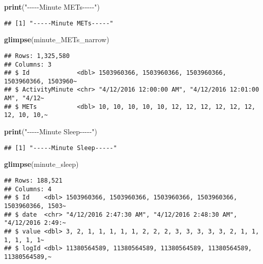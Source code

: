 \documentclass[
]{article}
\newenvironment{Shaded}{\begin{snugshade}}{\end{snugshade}}
\newcommand{\FunctionTok}[1]{\textcolor[rgb]{0.13,0.29,0.53}{\textbf{#1}}}
\newcommand{\NormalTok}[1]{#1}
\newcommand{\StringTok}[1]{\textcolor[rgb]{0.31,0.60,0.02}{#1}}
\begin{document}
\begin{Shaded}
\begin{Highlighting}[]
\FunctionTok{print}\NormalTok{(}\StringTok{"{-}{-}{-}{-}{-}Minute METs{-}{-}{-}{-}{-}"}\NormalTok{)}
\end{Highlighting}
\end{Shaded}

\begin{verbatim}
## [1] "-----Minute METs-----"
\end{verbatim}

\begin{Shaded}
\begin{Highlighting}[]
\FunctionTok{glimpse}\NormalTok{(minute\_METs\_narrow)}
\end{Highlighting}
\end{Shaded}

\begin{verbatim}
## Rows: 1,325,580
## Columns: 3
## $ Id             <dbl> 1503960366, 1503960366, 1503960366, 1503960366, 1503960~
## $ ActivityMinute <chr> "4/12/2016 12:00:00 AM", "4/12/2016 12:01:00 AM", "4/12~
## $ METs           <dbl> 10, 10, 10, 10, 10, 12, 12, 12, 12, 12, 12, 12, 10, 10,~
\end{verbatim}

\begin{Shaded}
\begin{Highlighting}[]
\FunctionTok{print}\NormalTok{(}\StringTok{"{-}{-}{-}{-}{-}Minute Sleep{-}{-}{-}{-}{-}"}\NormalTok{)}
\end{Highlighting}
\end{Shaded}

\begin{verbatim}
## [1] "-----Minute Sleep-----"
\end{verbatim}

\begin{Shaded}
\begin{Highlighting}[]
\FunctionTok{glimpse}\NormalTok{(minute\_sleep)}
\end{Highlighting}
\end{Shaded}

\begin{verbatim}
## Rows: 188,521
## Columns: 4
## $ Id    <dbl> 1503960366, 1503960366, 1503960366, 1503960366, 1503960366, 1503~
## $ date  <chr> "4/12/2016 2:47:30 AM", "4/12/2016 2:48:30 AM", "4/12/2016 2:49:~
## $ value <dbl> 3, 2, 1, 1, 1, 1, 1, 2, 2, 2, 3, 3, 3, 3, 3, 2, 1, 1, 1, 1, 1, 1~
## $ logId <dbl> 11380564589, 11380564589, 11380564589, 11380564589, 11380564589,~
\end{verbatim}
\end{document}
